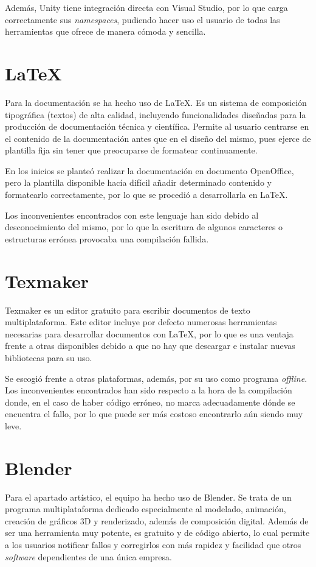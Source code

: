 Además, Unity tiene integración directa con Visual Studio, por lo que carga correctamente sus \textit{namespaces}, pudiendo hacer uso el usuario de todas las herramientas que ofrece de manera cómoda y sencilla.

\section{LaTeX}

Para la documentación se ha hecho uso de LaTeX. Es un sistema de composición tipográfica (textos) de alta calidad, incluyendo funcionalidades diseñadas para la producción de documentación técnica y científica. Permite al usuario centrarse en el contenido de la documentación antes que en el diseño del mismo, pues ejerce de plantilla fija sin tener que preocuparse de formatear continuamente.

En los inicios se planteó realizar la documentación en documento OpenOffice, pero la plantilla disponible hacía difícil añadir determinado contenido y formatearlo correctamente, por lo que se procedió a desarrollarla en LaTeX. 

Los inconvenientes encontrados con este lenguaje han sido debido al desconocimiento del mismo, por lo que la escritura de algunos caracteres o estructuras errónea provocaba una compilación fallida.

\section{Texmaker}

Texmaker es un editor gratuito para escribir documentos de texto multiplataforma. Este editor incluye por defecto numerosas herramientas necesarias para desarrollar documentos con LaTeX, por lo que es una ventaja frente a otras disponibles debido a que no hay que descargar e instalar nuevas bibliotecas para su uso.

Se escogió frente a otras plataformas, además, por su uso como programa \textit{offline}. Los inconvenientes encontrados han sido respecto a la hora de la compilación donde, en el caso de haber código erróneo, no marca adecuadamente dónde se encuentra el fallo, por lo que puede ser más costoso encontrarlo aún siendo muy leve.

\section{Blender}

Para el apartado artístico, el equipo ha hecho uso de Blender. Se trata de un programa multiplataforma dedicado especialmente al modelado, animación, creación de gráficos 3D y renderizado, además de composición digital. Además de ser una herramienta muy potente, es gratuito y de código abierto, lo cual permite a los usuarios notificar fallos y corregirlos con más rapidez y facilidad que otros \textit{software} dependientes de una única empresa.

